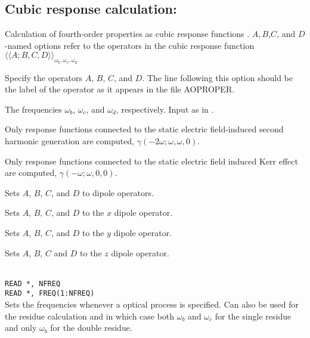 \subsection{Cubic response calculation: }
Calculation of fourth-order properties as cubic response functions
\cite{pndjovhacpl242,djpnhajcp105,pndjhapdkrthhkcpl253}.
$A,B$,$C$, and $D$-named options refer to the operators in the cubic
response function
$\langle\!\langle A;B,C,D \rangle\!\rangle_{\omega_b,\omega_c,\omega_d}$

\begin{description}

\item[, , , ]
Specify the operators $A$, $B$, $C$, and $D$. The line following this
option should be the label of the operator as it appears in the file
AOPROPER.

\item[, , ]
The frequencies
$\omega_b$, $\omega_c$, and $\omega_d$, respectively. Input as in
.

\item{}
Only response functions connected to the static electric field-induced
second harmonic generation are computed,
$\gamma(-2\omega;\omega,\omega,0)$.

\item{}
Only response functions connected to the static electric field induced
Kerr effect are computed,
$\gamma(-\omega;\omega,0,0)$.

\item{}
Sets $A$, $B$, $C$, and $D$ to dipole operators.

\item{}
Sets $A$, $B$, $C$, and $D$ to the $x$ dipole operator.

\item{}
Sets $A$, $B$, $C$, and $D$ to the $y$ dipole operator.

\item{}
Sets $A$, $B$, $C$ and $D$ to the $z$ dipole operator.

\item{}\\
\verb|READ *, NFREQ|\\
\verb|READ *, FREQ(1:NFREQ)|\\
Sets the frequencies whenever a optical process is specified.
Can also be used for the residue calculation and in which case
both $\omega_b$ and $\omega_c$ for the single residue and only
$\omega_b$ for the double residue.


\end{description}
